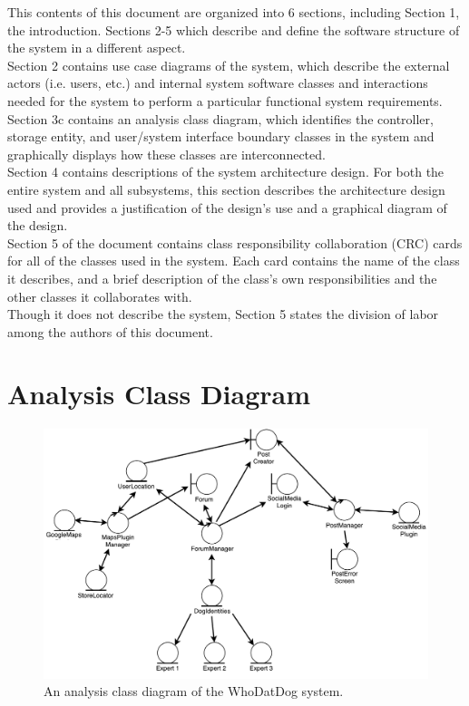 \documentclass[]{article}
\begin{document}
This contents of this document are organized into 6 sections, including Section 1, the introduction. Sections 2-5 which describe and define the software structure of the system in a different aspect.\\Section 2 contains use case diagrams of the system, which describe the external actors (i.e. users, etc.) and internal system software classes and interactions needed for the system to perform a particular functional system requirements.\\Section 3c contains an analysis class diagram, which identifies the controller, storage entity, and user/system interface boundary classes in the system and graphically displays how these classes are interconnected.\\Section 4 contains descriptions of the system architecture design. For both the entire system and all subsystems, this section describes the architecture design used and provides a justification of the design's use and a graphical diagram of the design.\\Section 5 of the document contains class responsibility collaboration (CRC) cards for all of the classes used in the system. Each card contains the name of the class it describes, and a brief description of the class's own responsibilities and the other classes it collaborates with.\\Though it does not describe the system, Section 5 states the division of labor among the authors of this document.

\section{Analysis Class Diagram}
\label{sec:analysisclassdiagram}

\begin{figure}[!ht]
\centering
\includegraphics[width=\textwidth]{3A04_D2_Analysis_Class_Diagram.pdf}
\caption{\label{fig:analysisclassdiagram}An analysis class diagram of the WhoDatDog system.}
\end{figure}
\end{document}
